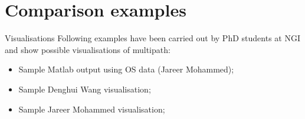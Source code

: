 \documentclass[11pt]{beamer}
\begin{document}
\section{Comparison examples}

	\begin{frame}{Visualisations}
		Following examples have been carried out by PhD students at NGI and show possible visualisations of multipath:
		
		\begin{itemize}
			\item Sample Matlab output using OS data (Jareer Mohammed);
			\item Sample Denghui Wang visualisation;
			\item Sample Jareer Mohammed visualisation;
		\end{itemize}

	\end{frame}
\end{document}
